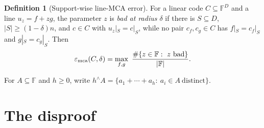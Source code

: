 \documentclass[11pt]{article}
\theoremstyle{definition}
\newtheorem{definition}[definition]{Definition}
\newcommand{\F}{\mathbb F}
\newcommand{\eps}{\varepsilon}
\begin{document}
\begin{definition}[Support-wise line-MCA error]\label{def:mca}
For a linear code $C\subseteq\F^D$ and a line $u_z=f+zg$, the parameter $z$ is \emph{bad at radius $\delta$} if there is $S\subseteq D$, $|S|\ge(1-\delta)n$, and $c\in C$ with $u_z|_S=c|_S$, while no pair $c_f,c_g\in C$ has $f|_S=c_f|_S$ and $g|_S=c_g|_S$.  Then
\[
        \eps_{\rm mca}(C,\delta)=\max_{f,g}\ \frac{\#\{z\in\F:\ z\ \text{bad}\}}{|\F|}.
\]
\end{definition}

For $A\subseteq\F$ and $h\ge0$, write $h^{\wedge}A=\{a_1+\cdots+a_h:\ a_i\in A\ \text{distinct}\}$.

\section{The disproof}
\end{document}
